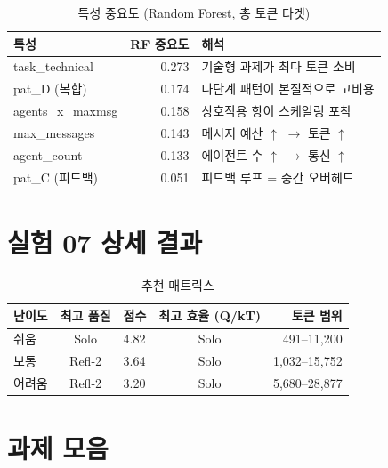 \documentclass[a4paper,11pt]{article}
\begin{document}
\begin{table}[H]
\centering
\caption{특성 중요도 (Random Forest, 총 토큰 타겟)}
\label{tab:feature-importance}
{\small
\begin{tabular}{lrl}
\toprule
특성 & RF 중요도 & 해석 \\
\midrule
task\_technical     & 0.273 & 기술형 과제가 최다 토큰 소비 \\
pat\_D (복합)       & 0.174 & 다단계 패턴이 본질적으로 고비용 \\
agents\_x\_maxmsg   & 0.158 & 상호작용 항이 스케일링 포착 \\
max\_messages       & 0.143 & 메시지 예산 $\uparrow$ $\to$ 토큰 $\uparrow$ \\
agent\_count        & 0.133 & 에이전트 수 $\uparrow$ $\to$ 통신 $\uparrow$ \\
pat\_C (피드백)     & 0.051 & 피드백 루프 = 중간 오버헤드 \\
\bottomrule
\end{tabular}
}
\end{table}

\section{실험 07 상세 결과}
\label{app:exp07-details}

\begin{table}[H]
\centering
\caption{추천 매트릭스}
\label{tab:recommendation-matrix}
{\small
\begin{tabular}{lclcr}
\toprule
난이도 & 최고 품질 & 점수 & 최고 효율 (Q/kT) & 토큰 범위 \\
\midrule
쉬움   & Solo   & 4.82 & Solo & 491--11,200 \\
보통   & Refl-2 & 3.64 & Solo & 1,032--15,752 \\
어려움 & Refl-2 & 3.20 & Solo & 5,680--28,877 \\
\bottomrule
\end{tabular}
}
\end{table}


\section{과제 모음}
\label{app:task-suite}
\end{document}
